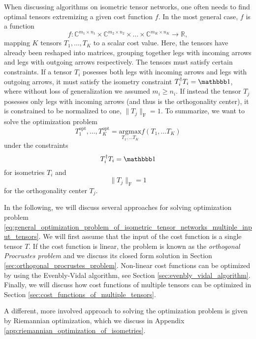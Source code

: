 When discussing algorithms on isometric tensor networks, one often needs to find optimal tensors extremizing a given cost function $f$. In the most general case, $f$ is a function
\begin{equation}
	\label{eq:general_optimization_problem_of_isometric_tensor_networks_cost_function_multiple_input_tensors}
	f:\mathbb{C}^{m_1\times n_1}\times\mathbb{C}^{m_2\times n_2}\times \dots \times \mathbb{C}^{m_K\times n_K} \to \mathbb{R},
\end{equation}
mapping $K$ tensors $T_1,\dots,T_K$ to a scalar cost value. Here, the tensors have already been reshaped into matrices, grouping together legs with incoming arrows and legs with outgoing arrows respectively. The tensors must satisfy certain constraints. If a tensor $T_i$ posesses both legs with incoming arrows and legs with outgoing arrows, it must satisfy the isometry constraint $T_i^\dagger T_i = \id$, where without loss of generalization we assumed $m_i \ge n_i$. If instead the tensor $T_j$ posesses only legs with incoming arrows (and thus is the orthogonality center), it is constrained to be normalized to one, $\lVert T_j\rVert_\text{F} = 1$. To summarize, we want to solve the optimization problem
\begin{equation}
	\label{eq:general_optimization_problem_of_isometric_tensor_networks_multiple_input_tensors}
	T_1^\text{opt}, \dots, T_K^\text{opt} = \underset{T_1,\dots T_K}{\text{argmax}}f\left(T_1, \dots T_K\right)
\end{equation}
under the constraints
\begin{equation}
	\label{eq:general_optimization_problem_of_isometric_tensor_networks_isometry_constraint}
	T_i^\dagger T_i = \id
\end{equation}
for isometries $T_i$ and
\begin{equation}
	\label{eq:general_optimization_problem_of_isometric_tensor_networks_ortho_center_constraint}
	\lVert T_j\rVert_\text{F} = 1
\end{equation}
for the orthogonality center $T_j$. \par
In the following, we will discuss several approaches for solving optimization problem \eqref{eq:general_optimization_problem_of_isometric_tensor_networks_multiple_input_tensors}. We will first assume that the input of the cost function is a single tensor $T$. If the cost function is linear, the problem is known as the \textit{orthogonal Procrustes problem} and we discuss its closed form solution in Section \ref{sec:orthogonal_procrustes_problem}. Non-linear cost functions can be optimized by using the Evenbly-Vidal algorithm, see Section \ref{sec:evenbly_vidal_algorithm}. Finally, we will discuss how cost functions of multiple tensors can be optimized in Section \ref{sec:cost_functions_of_multiple_tensors}. \par
A different, more involved approach to solving the optimization problem is given by Riemannian optimization, which we discuss in Appendix \ref{app:riemannian_optimization_of_isometries}.

